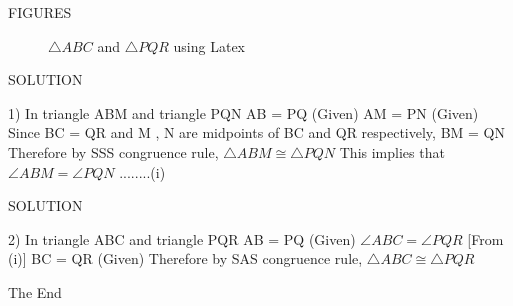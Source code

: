 \documentclass[11pt]{beamer}
\begin{document}
\begin{frame}{FIGURES}
\begin{figure}
\resizebox{10cm}{!}{}
\caption{$\triangle ABC$ and $\triangle PQR$ using Latex}
\end{figure}
\end{frame}

\begin{frame}{SOLUTION}
    \begin{flushleft}
       
        1) In triangle ABM and triangle PQN
        \newline
        \newline
        AB = PQ  (Given)
        \newline
        AM = PN  (Given)
        \newline
        Since BC = QR and M , N are midpoints of BC and QR respectively, 
        \newline
        BM = QN 
        \newline 
        Therefore by SSS congruence rule, $\triangle  ABM  \cong   \triangle  PQN$ 
        \newline
        \newline
        This implies that $\angle ABM = \angle PQN$    ........(i)

    \end{flushleft}
 

\end{frame}

\begin{frame}{SOLUTION}

\begin{flushleft}

        2) In triangle ABC and triangle PQR
        \newline
        \newline
        AB = PQ  (Given)
        \newline
        $\angle ABC = \angle PQR$ [From (i)]
        \newline
         BC = QR  (Given) 
        \newline 
        \newline
        Therefore by SAS congruence rule, $\triangle  ABC  \cong   \triangle  PQR$ 
        

\end{flushleft}
    
\end{frame}


\begin{frame}
\huge{\centerline{The End}}
\end{frame}
\end{document}
